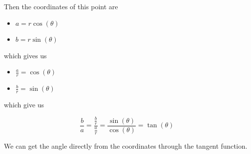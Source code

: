 \documentclass{ximera}
\begin{document}
Then the coordinates of this point are

\begin{itemize}
\item $a = r \cos(\theta)$
\item $b = r \sin(\theta)$
\end{itemize}

which gives us


\begin{itemize}
\item $\frac{a}{r} = \cos(\theta)$
\item $\frac{b}{r} = \sin(\theta)$
\end{itemize}



which give us


\[
\frac{b}{a} = \frac{\tfrac{b}{r}}{\tfrac{a}{r}} = \frac{\sin(\theta)}{\cos(\theta)} = \tan(\theta)
\]



We can get the angle directly from the coordinates through the tangent function.
\end{document}
